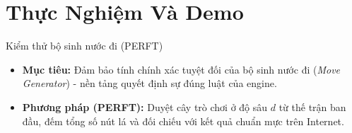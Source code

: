 
\section{Thực Nghiệm Và Demo}

\begin{frame}{Kiểm thử bộ sinh nước đi (PERFT)}
    \begin{itemize}
        \item<1-> \textbf{Mục tiêu:} Đảm bảo tính chính xác tuyệt đối của bộ sinh nước đi (\textit{Move Generator}) - nền tảng quyết định sự đúng luật của engine.
        \item<2-> \textbf{Phương pháp (PERFT):} Duyệt cây trò chơi ở độ sâu $d$ từ thế trận ban đầu, đếm tổng số nút lá và đối chiếu với kết quả chuẩn mực trên Internet.
    \end{itemize}
    
    \vspace{0.2cm}
\end{frame}


